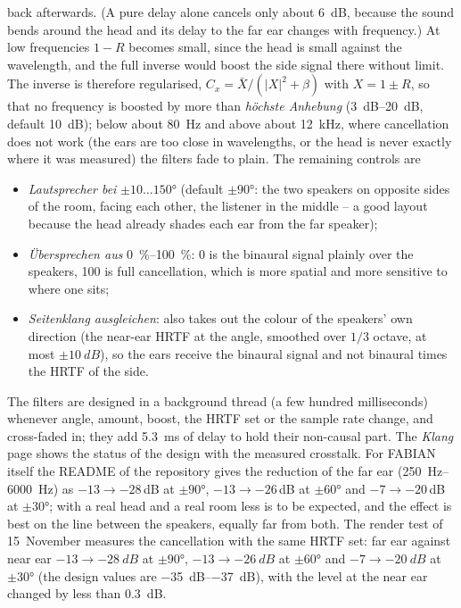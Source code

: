 \documentclass[11pt,a4paper,parskip=half,DIV=11,toc=bibliography]{scrartcl}
\newcommand{\ui}[1]{\emph{#1}}                 %
\begin{document}
back afterwards. (A pure delay alone cancels only about \SI{6}{dB}, because the sound bends around the head and its
delay to the far ear changes with frequency.) At low frequencies $1-R$ becomes small, since the head is small against the
wavelength, and the full inverse would boost the side signal there without limit. The inverse is therefore regularised,
$C_x = \bar X/(|X|^2+\beta)$ with $X = 1\pm R$, so that no frequency is boosted by more than \ui{höchste Anhebung}
(\SIrange{3}{20}{dB}, default \SI{10}{dB}); below about \SI{80}{Hz} and above about \SI{12}{kHz}, where cancellation does
not work (the ears are too close in wavelengths, or the head is never exactly where it was measured) the filters fade
to plain. The remaining controls are
\begin{itemize}
  \item \ui{Lautsprecher bei} $\pm10\dots150°$ (default $\pm90°$: the two speakers on opposite sides of the room, facing each
        other, the listener in the middle -- a good layout because the head already shades each ear from the far speaker);
  \item \ui{Übersprechen aus} \SIrange{0}{100}{\percent}: 0 is the binaural signal plainly over the speakers, 100 is full
        cancellation, which is more spatial and more sensitive to where one sits;
  \item \ui{Seitenklang ausgleichen}: also takes out the colour of the speakers' own direction (the near-ear HRTF at the
        angle, smoothed over $1/3$ octave, at most $\pm\SI{10}{dB}$), so the ears receive the binaural signal and not
        binaural times the HRTF of the side.
\end{itemize}
The filters are designed in a background thread (a few hundred milliseconds) whenever angle, amount, boost, the HRTF set or the
sample rate change, and cross-faded in; they add \SI{5.3}{ms} of delay to hold their non-causal part. The \ui{Klang} page
shows the status of the design with the measured crosstalk. For FABIAN itself the README of the repository gives the
reduction of the far ear (\SIrange{250}{6000}{Hz}) as $-13\rightarrow-28$\,dB at $\pm90°$, $-13\rightarrow-26$\,dB at
$\pm60°$ and $-7\rightarrow-20$\,dB at $\pm30°$; with a real head and a real room less is to be expected, and the effect is best
on the line between the speakers, equally far from both. The render test of 15~November measures the cancellation with the same HRTF set:
far ear against near ear $-13\rightarrow\SI{-28}{dB}$ at $\pm90°$, $-13\rightarrow\SI{-26}{dB}$ at $\pm60°$ and $-7\rightarrow\SI{-20}{dB}$ at $\pm30°$
(the design values are \SIrange{-35}{-37}{dB}), with the level at the near ear changed by less than \SI{0.3}{dB}.
\end{document}
